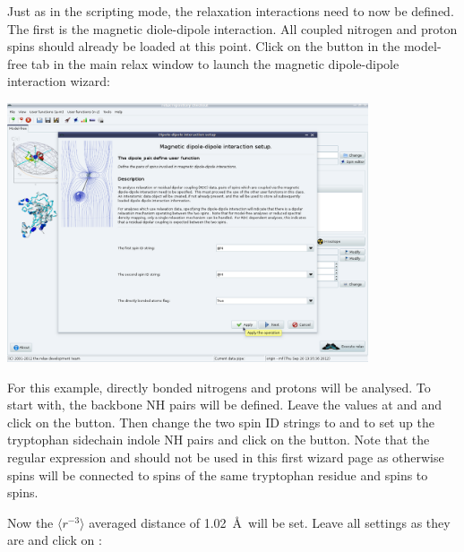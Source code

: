 \begin{htmlonly}
\begin{htmlonly}
Just as in the scripting mode, the relaxation interactions need to now be defined.  The first is the magnetic diole-dipole interaction.  All coupled nitrogen and proton spins should already be loaded at this point.  Click on the  button in the model-free tab in the main relax window to launch the magnetic dipole-dipole interaction wizard:

\begin{minipage}[h]{\linewidth}
\centerline{\includegraphics[width=0.8\textwidth, bb=14 14 1415 1019]{graphics/screenshots/mf_analysis/dipole_wizard_define}}
\end{minipage}

For this example, directly bonded nitrogens and protons will be analysed.  To start with, the backbone NH pairs will be defined.  Leave the values at  and  and click on the  button.  Then change the two spin ID strings to  and  to set up the tryptophan sidechain indole NH pairs and click on the  button.  Note that the regular expression  and  should not be used in this first wizard page as otherwise  spins will be connected to  spins of the same tryptophan residue and  spins to  spins.

Now the $\langle r^{-3} \rangle$ averaged distance of 1.02~\AA\ will be set.  Leave all settings as they are and click on :


\end{htmlonly}
\end{htmlonly}
